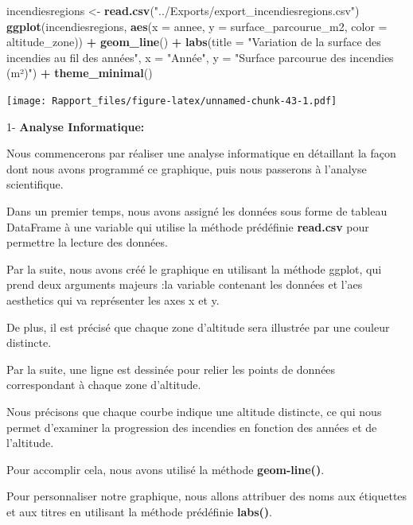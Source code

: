 \documentclass[
]{article}
\newenvironment{Shaded}{\begin{snugshade}}{\end{snugshade}}
\newcommand{\AttributeTok}[1]{\textcolor[rgb]{0.13,0.29,0.53}{#1}}
\newcommand{\FunctionTok}[1]{\textcolor[rgb]{0.13,0.29,0.53}{\textbf{#1}}}
\newcommand{\NormalTok}[1]{#1}
\newcommand{\OtherTok}[1]{\textcolor[rgb]{0.56,0.35,0.01}{#1}}
\newcommand{\SpecialCharTok}[1]{\textcolor[rgb]{0.81,0.36,0.00}{\textbf{#1}}}
\newcommand{\StringTok}[1]{\textcolor[rgb]{0.31,0.60,0.02}{#1}}
\begin{document}
\begin{Shaded}
\begin{Highlighting}[]
\NormalTok{incendiesregions }\OtherTok{\textless{}{-}} \FunctionTok{read.csv}\NormalTok{(}\StringTok{"../Exports/export\_incendiesregions.csv"}\NormalTok{)}
\FunctionTok{ggplot}\NormalTok{(incendiesregions, }\FunctionTok{aes}\NormalTok{(}\AttributeTok{x =}\NormalTok{ annee, }\AttributeTok{y =}\NormalTok{ surface\_parcourue\_m2, }\AttributeTok{color =}\NormalTok{ altitude\_zone)) }\SpecialCharTok{+}
  \FunctionTok{geom\_line}\NormalTok{() }\SpecialCharTok{+}
  \FunctionTok{labs}\NormalTok{(}\AttributeTok{title =} \StringTok{"Variation de la surface des incendies au fil des années"}\NormalTok{,}
       \AttributeTok{x =} \StringTok{"Année"}\NormalTok{, }\AttributeTok{y =} \StringTok{"Surface parcourue des incendies (m²)"}\NormalTok{) }\SpecialCharTok{+}
  \FunctionTok{theme\_minimal}\NormalTok{()}
\end{Highlighting}
\end{Shaded}

\texttt{[image: Rapport\_files/figure-latex/unnamed-chunk-43-1.pdf]}

1- \textbf{Analyse Informatique:}

Nous commencerons par réaliser une analyse informatique en détaillant la
façon dont nous avons programmé ce graphique, puis nous passerons à
l'analyse scientifique.

Dans un premier temps, nous avons assigné les données sous forme de
tableau DataFrame à une variable qui utilise la méthode prédéfinie
\textbf{read.csv} pour permettre la lecture des données.

Par la suite, nous avons créé le graphique en utilisant la méthode
ggplot, qui prend deux arguments majeurs :la variable contenant les
données et l'aes aesthetics qui va représenter les axes x et y.

De plus, il est précisé que chaque zone d'altitude sera illustrée par
une couleur distincte.

Par la suite, une ligne est dessinée pour relier les points de données
correspondant à chaque zone d'altitude.

Nous précisons que chaque courbe indique une altitude distincte, ce qui
nous permet d'examiner la progression des incendies en fonction des
années et de l'altitude.

Pour accomplir cela, nous avons utilisé la méthode \textbf{geom-line()}.

Pour personnaliser notre graphique, nous allons attribuer des noms aux
étiquettes et aux titres en utilisant la méthode prédéfinie
\textbf{labs()}.
\end{document}
